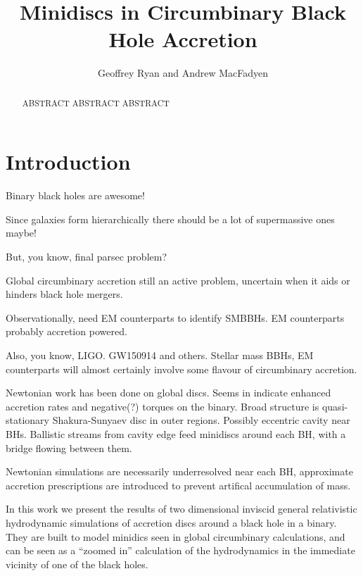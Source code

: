 \documentclass{emulateapj}
\begin{document}
\title{Minidiscs in Circumbinary Black Hole Accretion}
\author{Geoffrey Ryan and Andrew MacFadyen}

\begin{abstract}

ABSTRACT ABSTRACT ABSTRACT

\end{abstract}



\section{Introduction}
\label{sec:intro}

Binary black holes are awesome!  

Since galaxies form hierarchically there should be a lot of supermassive ones maybe!  

But, you know, final parsec problem?

Global circumbinary accretion still an active problem, uncertain when it aids
or hinders black hole mergers.

Observationally, need EM counterparts to identify SMBBHs.  EM counterparts 
probably accretion powered.

Also, you know, LIGO.  GW150914 and others.  Stellar mass BBHs, EM counterparts
will almost certainly involve some flavour of circumbinary accretion.

Newtonian work has been done on global discs.  Seems in indicate enhanced
accretion rates and negative(?) torques on the binary.  Broad structure is
quasi-stationary Shakura-Sunyaev disc in outer regions. Possibly eccentric
cavity near BHs. Ballistic streams from cavity edge feed minidiscs around each BH, with a bridge flowing between them.

Newtonian simulations are necessarily underresolved near each BH, approximate accretion prescriptions are introduced to prevent artifical accumulation of mass.

In this work we present the results of two dimensional inviscid general relativistic
hydrodynamic simulations of accretion discs around a black hole in a binary.
They are built to model minidics seen in global circumbinary calculations,
and can be seen as a ``zoomed in'' calculation of the hydrodynamics in the 
immediate vicinity of one of the black holes.
\end{document}
